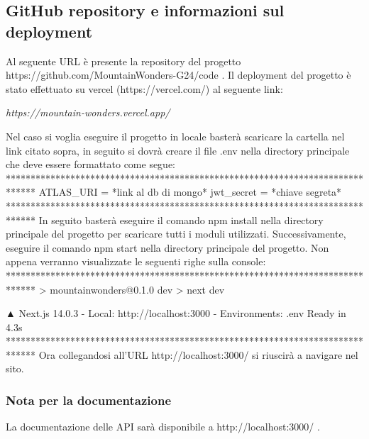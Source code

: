 \documentclass[a4paper,12pt]{article}
\begin{document}
\subsection{GitHub repository e informazioni sul deployment}
Al seguente URL è presente la repository del progetto https://github.com/MountainWonders-G24/code .
\newline
\newline
\newline
Il deployment del progetto è stato effettuato su vercel (https://vercel.com/) al seguente link:
\begin{center} \textit{ https://mountain-wonders.vercel.app/ } \end{center}
\newline
Nel caso si voglia eseguire il progetto in locale basterà scaricare la cartella nel link citato  sopra, in seguito si dovrà creare il file .env nella directory principale che deve essere formattato come segue: \newline
\newline
******************************************************************************
\newline ATLAS\_URI = *link al db di mongo* \newline
jwt\_secret = *chiave segreta* \newline \newline
******************************************************************************
\newline
In seguito basterà eseguire il comando npm install nella directory principale del progetto per scaricare tutti i moduli utilizzati. Successivamente, eseguire il comando npm start nella directory principale del progetto. Non appena verranno visualizzate le seguenti righe sulla console:
\newline
\newline
******************************************************************************
\newline 
> mountainwonders@0.1.0 dev \newline
> next dev \newline

   ▲ Next.js 14.0.3 \newline
   - Local: http://localhost:3000 \newline
   - Environments: .env \newline
\newline
  Ready in 4.3s \newline \newline
******************************************************************************
\newline
Ora collegandosi all’URL http://localhost:3000/ si riuscirà a navigare nel sito.
\newline 
\subsubsection{Nota per la documentazione}
La documentazione delle API sarà disponibile a http://localhost:3000/ . 
\end{document}
